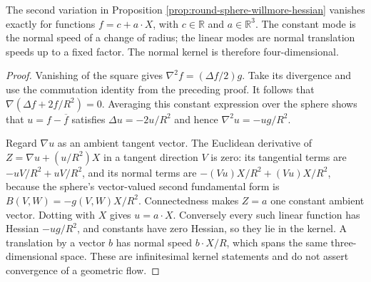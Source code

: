 \begin{proposition}\label{prop:round-sphere-willmore-kernel}
The second variation in Proposition \ref{prop:round-sphere-willmore-hessian} vanishes exactly for functions $f=c+a\cdot X$, with $c\in\mathbb R$ and $a\in\mathbb R^3$. The constant mode is the normal speed of a change of radius; the linear modes are normal translation speeds up to a fixed factor. The normal kernel is therefore four-dimensional.
\end{proposition}
\begin{proof}
Vanishing of the square gives $\nabla^2f=(\Delta f/2)g$. Take its divergence and use the commutation identity from the preceding proof. It follows that $\nabla(\Delta f+2f/R^2)=0$. Averaging this constant expression over the sphere shows that $u=f-\overline f$ satisfies $\Delta u=-2u/R^2$ and hence $\nabla^2u=-ug/R^2$.

Regard $\nabla u$ as an ambient tangent vector. The Euclidean derivative of
$Z=\nabla u+(u/R^2)X$ in a tangent direction $V$ is zero: its tangential terms are $-uV/R^2+uV/R^2$, and its normal terms are $-(V u)X/R^2+(V u)X/R^2$, because the sphere's vector-valued second fundamental form is $B(V,W)=-g(V,W)X/R^2$. Connectedness makes $Z=a$ one constant ambient vector. Dotting with $X$ gives $u=a\cdot X$. Conversely every such linear function has Hessian $-ug/R^2$, and constants have zero Hessian, so they lie in the kernel. A translation by a vector $b$ has normal speed $b\cdot X/R$, which spans the same three-dimensional space. These are infinitesimal kernel statements and do not assert convergence of a geometric flow.
\end{proof}
